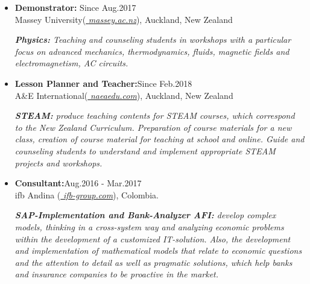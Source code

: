 \begin{itemize}

    \item {\bf Demonstrator:} \hfill \textcolor{my_blue}{Since Aug.2017}\\
          {Massey University({\href{www.massey.ac.nz}{\textcolor{my_blue}{\em
                          massey.ac.nz}}}), Auckland, New Zealand}

          \emph{\textbf{Physics:} Teaching and counseling students in workshops with a particular focus on advanced mechanics, thermodynamics, fluids, magnetic fields and electromagnetism, AC circuits.}

    \item {\bf Lesson Planner and Teacher:}\hfill \textcolor{my_blue}{Since
              Feb.2018}\\
          {A\&E International({\href{www.naeaedu.com}{\textcolor{my_blue}{\em
                          naeaedu.com}}}), Auckland, New Zealand}

          \emph{\textbf{STEAM:} produce teaching contents for STEAM
              courses, which correspond to the New Zealand Curriculum. Preparation of course
              materials for a new class, creation of course material for teaching at school
              and online. Guide  and counseling students to understand and implement
              appropriate STEAM projects and workshops.}

    \item {\bf Consultant:}\hfill \textcolor{my_blue}{Aug.2016 - Mar.2017}\\
          {ifb Andina ({\href{www.ifb-group.com/en/}{\textcolor{my_blue}{\em
                          ifb-group.com}}}), Colombia.}


          \emph{\textbf{SAP-Implementation and Bank-Analyzer AFI:}
              develop complex models, thinking in a cross-system way
              and analyzing economic problems within the development of a customized
              IT-solution. Also, the development and implementation of mathematical models
              that relate to economic questions and the attention to detail as well as
              pragmatic solutions, which help banks and insurance companies to be proactive
              in the market.}


\end{itemize}
